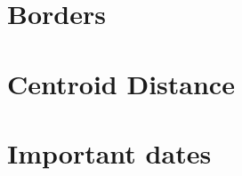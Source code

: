 \documentclass[10pt]{article}
\begin{document}






\clearpage\section{Borders}







\clearpage\section{Centroid Distance}








\appendix

\clearpage\section{Important dates}\label{sec:dates}


\end{document}
